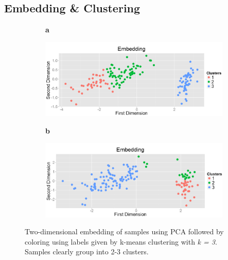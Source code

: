 \documentclass[12pt]{article}
\begin{document}
\subsection{Embedding \& Clustering}
\label{subsec:SubSecEmbedding}

\begin{figure}[t!]
	\centering
	\begin{subfigure}[t]{0.01\textwidth}
		\textbf{a}
	\end{subfigure}
	\begin{subfigure}[t]{0.48\textwidth}
		\includegraphics[width=\textwidth,valign=t]{Figures/Iris/EmbedRaw.png}
		\subcaption{}
		\label{fig:FigEmbedRaw}
	\end{subfigure}\hfill
	\begin{subfigure}[t]{0.01\textwidth}
		\textbf{b}
	\end{subfigure}
	\begin{subfigure}[t]{0.48\textwidth}
		\includegraphics[width=\textwidth,valign=t]{Figures/Iris/EmbedZ.png}
		\subcaption{}
		\label{fig:FigEmbedZ}
	\end{subfigure}
	\vspace{-1.5\baselineskip}
	\caption{Two-dimensional embedding of samples using PCA followed by coloring using labels given by k-means clustering with \textit{k = 3}. Samples clearly group into 2-3 clusters.}
	\label{fig:FigEmbedding}
\end{figure}
\end{document}
